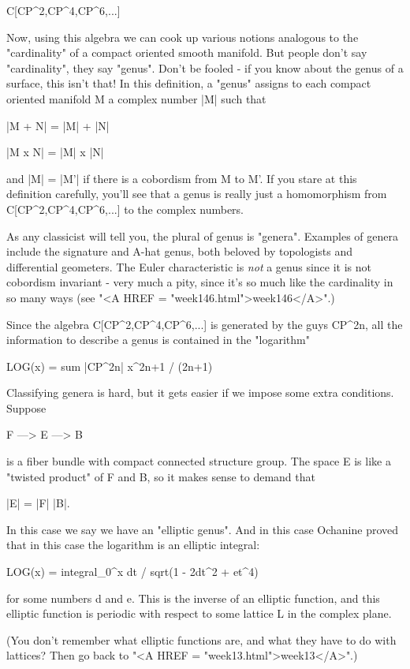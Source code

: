 C[CP^{2},CP^{4},CP^{6},...]

Now, using this algebra we can cook up various notions analogous to the
"cardinality" of a compact oriented smooth manifold.  But
people don't say "cardinality", they say "genus".
Don't be fooled - if you know about the genus of a surface, this isn't
that!  In this definition, a "genus" assigns to each compact
oriented manifold M a complex number |M| such that

|M + N| = |M| + |N|

|M x N| = |M| x |N| 

and |M| = |M'| if there is a cobordism from M to M'.  If you stare
at this definition carefully, you'll see that a genus is really just
a homomorphism from C[CP^{2},CP^{4},CP^{6},...] 
to the complex numbers.  

As any classicist will tell you, the plural of genus is "genera".  
Examples of genera include the signature and A-hat genus, both 
beloved by topologists and differential geometers.   The Euler 
characteristic is \emph{not} a genus since it is not cobordism invariant - 
very much a pity, since it's so much like the cardinality in so 
many ways (see "<A HREF = "week146.html">week146</A>".)  

Since the algebra C[CP^{2},CP^{4},CP^{6},...] 
is generated by the guys CP^{2n},
all the information to describe a genus is
contained in the "logarithm"

LOG(x) = sum |CP^{2n}| x^{2n+1} / (2n+1)

Classifying genera is hard, but it gets easier if we impose some
extra conditions.  Suppose 

F ---> E ---> B

is a fiber bundle with compact connected structure group.  The space
E is like a "twisted product" of F and B, so it makes sense to demand
that 

|E| = |F| |B|.

In this case we say we have an "elliptic genus".  And in this case 
Ochanine proved that in this case the logarithm is an elliptic integral:

LOG(x) = integral_{0}^{x}  dt / sqrt(1 - 2dt^{2} + 
et^{4}) 

for some numbers d and e.  This is the inverse of an elliptic function,
and this elliptic function is periodic with respect to some lattice L in 
the complex plane.  

(You don't remember what elliptic functions are, and what they have to
do with lattices?  Then go back to "<A HREF =
"week13.html">week13</A>".)


